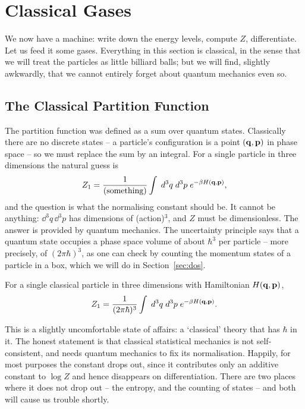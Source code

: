 \documentclass[a4paper]{scrartcl}
\begin{document}
\section{Classical Gases}

We now have a machine: write down the energy levels, compute $Z$, differentiate. Let us feed it some gases. Everything in this section is classical, in the sense that we will treat the particles as little billiard balls; but we will find, slightly awkwardly, that we cannot entirely forget about quantum mechanics even so.

\subsection{The Classical Partition Function}\label{sec:classicalZ}

The partition function was defined as a sum over quantum states. Classically there are no discrete states -- a particle's configuration is a point $(\mathbf{q}, \mathbf{p})$ in phase space -- so we must replace the sum by an integral. For a single particle in three dimensions the natural guess is
$$
Z_1 = \frac{1}{(\text{something})}\int \; d^3 q \; d^3 p \; e^{-\beta H(\mathbf{q}, \mathbf{p})},
$$
and the question is what the normalising constant should be. It cannot be anything: $\dd^3q\,\dd^3 p$ has dimensions of (action)$^3$, and $Z$ must be dimensionless. The answer is provided by quantum mechanics. The uncertainty principle says that a quantum state occupies a phase space volume of about $\hbar^3$ per particle -- more precisely, of $(2\pi\hbar)^3$, as one can check by counting the momentum states of a particle in a box, which we will do in Section~\ref{sec:dos}.

\begin{definition}
	For a single classical particle in three dimensions with Hamiltonian $H(\mathbf{q}, \mathbf{p})$,
	$$
	Z_1 = \frac{1}{(2\pi\hbar)^3}\int \; d^3 q\; d^3 p\; e^{-\beta H(\mathbf{q}, \mathbf{p})}.
	$$
\end{definition}

This is a slightly uncomfortable state of affairs: a `classical' theory that has $\hbar$ in it. The honest statement is that classical statistical mechanics is not self-consistent, and needs quantum mechanics to fix its normalisation. Happily, for most purposes the constant drops out, since it contributes only an additive constant to $\log Z$ and hence disappears on differentiation. There are two places where it does not drop out -- the entropy, and the counting of states -- and both will cause us trouble shortly.
\end{document}
